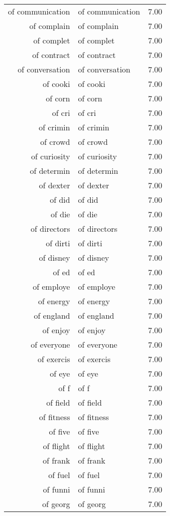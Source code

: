 \begin{table}[ht]
\begin{tabular}{rlr}
  of communication & of communication & 7.00 \\ 
  of complain & of complain & 7.00 \\ 
  of complet & of complet & 7.00 \\ 
  of contract & of contract & 7.00 \\ 
  of conversation & of conversation & 7.00 \\ 
  of cooki & of cooki & 7.00 \\ 
  of corn & of corn & 7.00 \\ 
  of cri & of cri & 7.00 \\ 
  of crimin & of crimin & 7.00 \\ 
  of crowd & of crowd & 7.00 \\ 
  of curiosity & of curiosity & 7.00 \\ 
  of determin & of determin & 7.00 \\ 
  of dexter & of dexter & 7.00 \\ 
  of did & of did & 7.00 \\ 
  of die & of die & 7.00 \\ 
  of directors & of directors & 7.00 \\ 
  of dirti & of dirti & 7.00 \\ 
  of disney & of disney & 7.00 \\ 
  of ed & of ed & 7.00 \\ 
  of employe & of employe & 7.00 \\ 
  of energy & of energy & 7.00 \\ 
  of england & of england & 7.00 \\ 
  of enjoy & of enjoy & 7.00 \\ 
  of everyone & of everyone & 7.00 \\ 
  of exercis & of exercis & 7.00 \\ 
  of eye & of eye & 7.00 \\ 
  of f & of f & 7.00 \\ 
  of field & of field & 7.00 \\ 
  of fitness & of fitness & 7.00 \\ 
  of five & of five & 7.00 \\ 
  of flight & of flight & 7.00 \\ 
  of frank & of frank & 7.00 \\ 
  of fuel & of fuel & 7.00 \\ 
  of funni & of funni & 7.00 \\ 
  of georg & of georg & 7.00 \\ 

\end{tabular}
\end{table}
